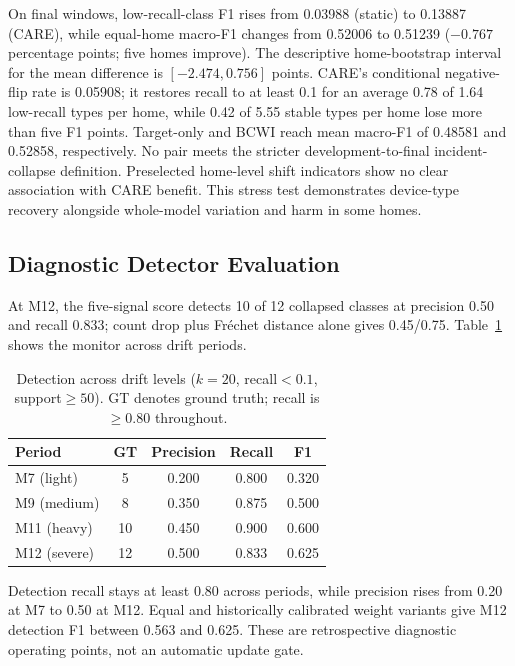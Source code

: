 \documentclass[journal]{IEEEtran}
\begin{document}
On final windows, low-recall-class F1 rises from 0.03988 (static) to 0.13887 (CARE), while equal-home macro-F1 changes from 0.52006 to 0.51239 ($-0.767$ percentage points; five homes improve). The descriptive home-bootstrap interval for the mean difference is $[-2.474,0.756]$ points. CARE's conditional negative-flip rate is 0.05908; it restores recall to at least 0.1 for an average 0.78 of 1.64 low-recall types per home, while 0.42 of 5.55 stable types per home lose more than five F1 points. Target-only and BCWI reach mean macro-F1 of 0.48581 and 0.52858, respectively. No pair meets the stricter development-to-final incident-collapse definition. Preselected home-level shift indicators show no clear association with CARE benefit. This stress test demonstrates device-type recovery alongside whole-model variation and harm in some homes.

\subsection{Diagnostic Detector Evaluation}
\label{sec:detection_eval}


At M12, the five-signal score detects 10 of 12 collapsed classes at precision 0.50 and recall 0.833; count drop plus Fr\'{e}chet distance alone gives 0.45/0.75. Table~\ref{tab:trigger} shows the monitor across drift periods.

\begin{table}[!htbp]
\centering
\caption{Detection across drift levels ($k{=}20$, recall${<}0.1$, support${\geq}50$). GT denotes ground truth; recall is $\geq$0.80 throughout.}
\label{tab:trigger}
\small
\begin{tabular}{@{}l cccc@{}}
\toprule
Period & GT & Precision & Recall & F1 \\
\midrule
M7 (light)   & 5  & 0.200 & 0.800 & 0.320 \\
M9 (medium)  & 8  & 0.350 & 0.875 & 0.500 \\
M11 (heavy)  & 10 & 0.450 & 0.900 & 0.600 \\
M12 (severe) & 12 & 0.500 & 0.833 & 0.625 \\
\bottomrule
\end{tabular}
\end{table}


Detection recall stays at least 0.80 across periods, while precision rises from 0.20 at M7 to 0.50 at M12. Equal and historically calibrated weight variants give M12 detection F1 between 0.563 and 0.625. These are retrospective diagnostic operating points, not an automatic update gate.
\end{document}
